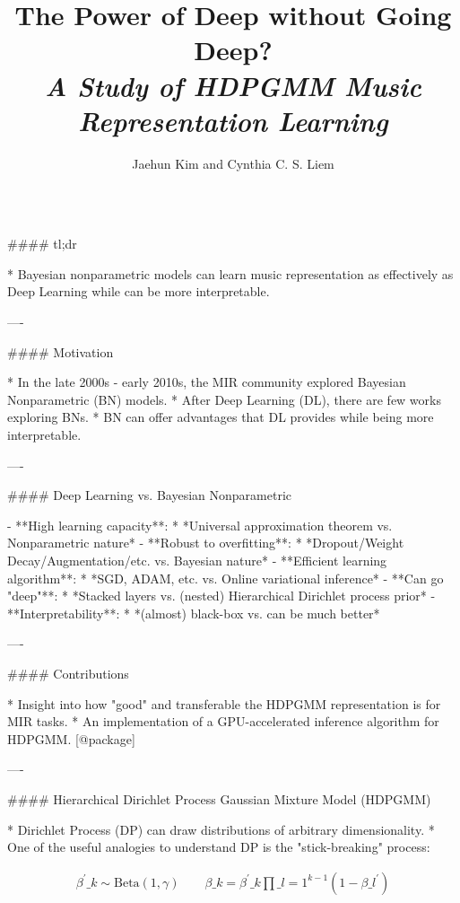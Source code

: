 \documentclass{beamer}
\author[j.h.kim@tudelft.nl]{Jaehun Kim and Cynthia C. S. Liem}
\title{\textbf{The Power of Deep without Going Deep?}\\ \textit{A Study of HDPGMM Music Representation Learning}}
\institute{Delft University of Technology}
\begin{document}
\begin{frame}[fragile]\centering



\begin{columns}[T]

\begin{column}{.46\textwidth}

\begin{markdown}

#### tl;dr

* Bayesian nonparametric models can learn music representation as effectively as Deep Learning while can be more interpretable.

----


#### Motivation

* In the late 2000s - early 2010s, the MIR community explored Bayesian Nonparametric (BN) models.
* After Deep Learning (DL), there are few works exploring BNs.
* BN can offer advantages that DL provides while being more interpretable.

----

#### Deep Learning vs. Bayesian Nonparametric

- **High learning capacity**:
    * *Universal approximation theorem vs. Nonparametric nature*
- **Robust to overfitting**:
    * *Dropout/Weight Decay/Augmentation/etc. vs. Bayesian nature*
- **Efficient learning algorithm**:
    * *SGD, ADAM, etc. vs. Online variational inference*
- **Can go "deep"**:
    * *Stacked layers vs. (nested) Hierarchical Dirichlet process prior*
- **Interpretability**:
    * *(almost) black-box vs. can be much better*

----

#### Contributions

* Insight into how "good" and transferable the HDPGMM representation is for MIR tasks.
* An implementation of a GPU-accelerated inference algorithm for HDPGMM. [@package]

----

\bigskip
{\hrulefill}
\bigskip

#### Hierarchical Dirichlet Process Gaussian Mixture Model (HDPGMM)

* Dirichlet Process (DP) can draw distributions of arbitrary dimensionality.
* One of the useful analogies to understand DP is the "stick-breaking" process:

\begin{align}
    \beta^{\prime}\_{k} \sim \text{Beta}(1, \gamma) \qquad
    \beta\_{k} = \beta^{\prime}\_{k} \prod\_{l=1}^{k-1} (1 - \beta\_{l}^{\prime})
\end{align}



\end{markdown}
\end{column}
\end{columns}
\end{frame}
\end{document}
